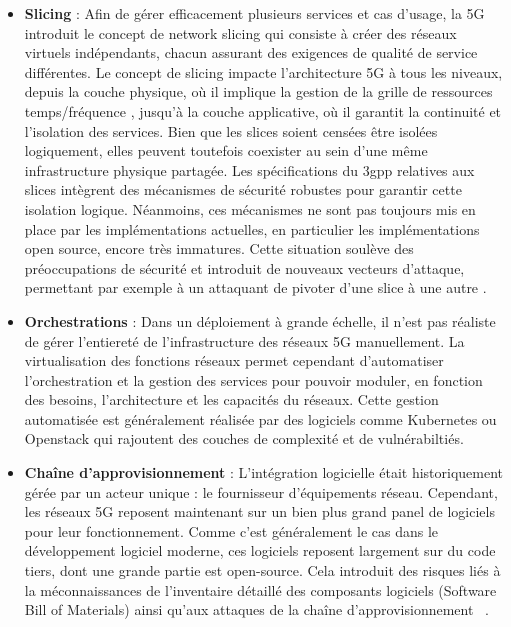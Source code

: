 \documentclass[a4paper,11pt,twoside]{StyleThese}
\begin{document}
\begin{itemize}

    \item \textbf{Slicing} : Afin de gérer efficacement plusieurs services et cas d’usage, la 5G introduit le concept de network slicing qui consiste à créer des réseaux virtuels indépendants, chacun assurant des exigences de qualité de service différentes. Le concept de slicing impacte l’architecture 5G à tous les niveaux, depuis la couche physique, où il implique la gestion de la grille de ressources temps/fréquence \cite{Sexton2019}, jusqu’à la couche applicative, où il garantit la continuité et l’isolation des services. Bien que les slices soient censées être isolées logiquement, elles peuvent toutefois coexister au sein d’une même infrastructure physique partagée. Les spécifications du \gls{3gpp} relatives aux slices intègrent des mécanismes de sécurité robustes \cite{tr_33813, tr_33811} pour garantir cette isolation logique. Néanmoins, ces mécanismes ne sont pas toujours mis en place par les implémentations actuelles, en particulier les implémentations open source, encore très immatures. Cette situation soulève des préoccupations de sécurité et introduit de nouveaux vecteurs d’attaque, permettant par exemple à un attaquant de pivoter d'une slice à une autre \cite{slice2,slice3}.

    \item \textbf{Orchestrations} : Dans un déploiement à grande échelle, il n'est pas réaliste de gérer l'entiereté de l'infrastructure des réseaux 5G manuellement. La virtualisation des fonctions réseaux permet cependant d'automatiser l'orchestration et la gestion des services \cite{etsi_network_2024} pour pouvoir moduler, en fonction des besoins, l'architecture et les capacités du réseaux. Cette gestion automatisée est généralement réalisée par des logiciels comme Kubernetes ou Openstack qui rajoutent des couches de complexité et de vulnérabiltiés.
    
    \item \textbf{Chaîne d'approvisionnement} : L’intégration logicielle était historiquement gérée par un acteur unique : le fournisseur d’équipements réseau. Cependant, les réseaux 5G reposent maintenant sur un bien plus grand panel de logiciels pour leur fonctionnement. Comme c’est généralement le cas dans le développement logiciel moderne, ces logiciels reposent largement sur du code tiers, dont une grande partie est open-source. Cela introduit des risques liés à la méconnaissances de l'inventaire détaillé des composants logiciels (Software Bill of Materials) ainsi qu’aux attaques de la chaîne d’approvisionnement ~\cite{williams2025research, sammak2023developers, zimmermann_small_nodate, kula_developers_2018, log4shell}. %
    
\end{itemize}
\end{document}
